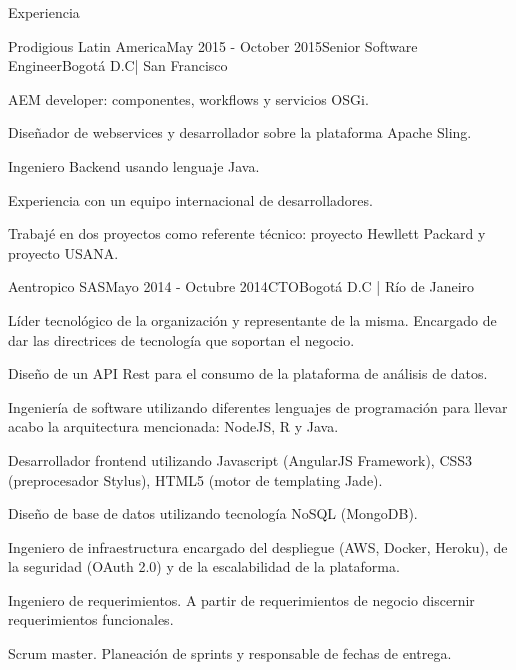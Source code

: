 \documentclass[spanish]{resume} %
\begin{document}
\begin{rSection}{Experiencia}

\begin{rSubsection}{Prodigious Latin America}{May 2015 - October 2015}{Senior Software Engineer}{Bogot\'a D.C| San Francisco}
\item AEM developer: componentes, workflows y servicios OSGi.
\item Diseñador de webservices y desarrollador sobre la plataforma Apache Sling.  
\item Ingeniero Backend usando lenguaje Java.
\item Experiencia con un equipo internacional de desarrolladores.
\item Trabajé en dos proyectos como referente técnico: proyecto Hewllett Packard y proyecto USANA.
\end{rSubsection}


\begin{rSubsection}{Aentropico SAS}{Mayo 2014 - Octubre 2014}{CTO}{Bogot\'a D.C | R\'io de Janeiro}
\item L\'ider tecnol\'ogico de la organizaci\'on y representante de la misma. Encargado de dar las directrices de tecnolog\'ia que soportan el negocio.
\item Dise\~no de un API Rest para el consumo de la plataforma de an\'alisis de datos.
\item Ingenier\'ia de software utilizando diferentes lenguajes de programaci\'on para llevar acabo la arquitectura mencionada: NodeJS, R y Java.
\item Desarrollador frontend utilizando Javascript (AngularJS Framework), CSS3 (preprocesador Stylus), HTML5 (motor de templating Jade).
\item Dise\~no de base de datos utilizando tecnolog\'ia NoSQL (MongoDB).
\item Ingeniero de infraestructura encargado del despliegue (AWS, Docker, Heroku), de la seguridad (OAuth 2.0) y de la escalabilidad de la plataforma.
\item Ingeniero de requerimientos. A partir de requerimientos de negocio discernir requerimientos funcionales.
\item Scrum master. Planeaci\'on de sprints y responsable de fechas de entrega.
\end{rSubsection}


\end{rSection}
\end{document}
